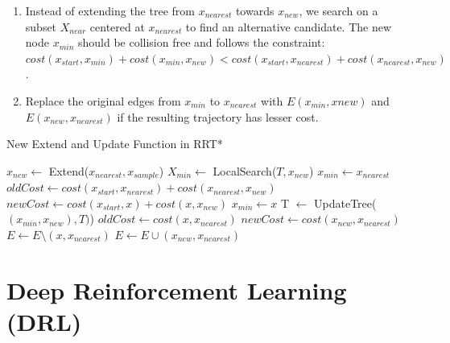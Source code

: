 \documentclass[../thesis.tex]{subfiles}
\begin{document}
\begin{enumerate}
 
      \item Instead of extending the tree from $x_{nearest}$ towards $x_{new}$, we search on a subset $X_{near}$ centered at $x_{nearest}$ to find an alternative candidate. The new node $x_{min}$ should be collision free and follows the constraint: $cost(x_{start},x_{min}) + cost(x_{min}, x_{new}) < cost(x_{start},x_{nearest}) + cost(x_{nearest}, x_{new})$.
      
      \item Replace the original edges from $x_{min}$ to $x_{nearest}$ with $E(x_{min}, x{new})$ and $E(x_{new}, x_{nearest})$ if the resulting trajectory has lesser cost.
 
\end{enumerate}
 
\begin{algorithm}
  \caption{New Extend and Update Function in RRT*} \label{alg:RRT_star}
  \begin{algorithmic}[1]
  \State $x_{new} \leftarrow $ Extend($x_{nearest}, x_{sample}$)
  \State $X_{min} \leftarrow $ LocalSearch($T, x_{new}$)
  \State $x_{min} \leftarrow x_{nearest}$
    \State $oldCost \leftarrow cost(x_{start},x_{nearest}) + cost(x_{nearest}, x_{new})$
    \State $newCost \leftarrow cost(x_{start},x) + cost(x, x_{new})$
    \State $x_{min} \leftarrow x$
    \EndIf
  \EndFor
  \State T $\leftarrow $ UpdateTree($(x_{min},x_{new}), T)$)
    \State $oldCost \leftarrow cost(x, x_{nearest})$
    \State $newCost \leftarrow cost(x_{new}, x_{nearest})$
          \State $E \leftarrow E \setminus (x, x_{nearest})$
          \State $E \leftarrow E \cup (x_{new}, x_{nearest})$
    \EndIf
  \EndFor
  \end{algorithmic}
\end{algorithm}
 

 
 
\section{Deep Reinforcement Learning (DRL)}
 
 
\end{document}
